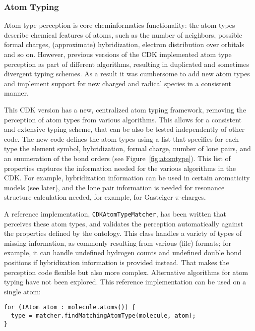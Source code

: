 \documentclass[doublespacing]{bmcart}
\begin{document}
  \subsubsection*{Atom Typing}

  Atom type perception is core cheminformatics functionality: the
  atom types describe chemical features of atoms, such as the number
  of neighbors, possible formal charges, (approximate) hybridization,
  electron distribution over orbitals and so on. However, previous
  versions of the CDK implemented atom type perception as part of
  different algorithms, resulting in duplicated and sometimes
  divergent typing schemes. As a result it was cumbersome to add new
  atom types and implement support for new charged and radical species
  in a consistent manner.
  
  This CDK version has a new, centralized atom typing framework,
  removing the perception of atom types from various algorithms. This
  allows for a consistent and extensive typing scheme, that can be
  also be tested independently of other code.  The new code defines
  the atom types using a list that specifies for each type the element
  symbol, hybridization, formal charge, number of lone pairs, and an
  enumeration of the bond orders (see Figure~\ref{fig:atomtype}). This list of
  properties captures the information needed for the various
  algorithms in the CDK. For example, hybridization information can be
  used in certain aromaticity models (see later), and the lone pair
  information is needed for resonance structure calculation needed,
  for example, for Gasteiger $\pi$-charges.

  A reference implementation, \texttt{CDKAtomTypeMatcher}, has been
  written that perceives these atom types, and validates the
  perception automatically against the properties defined by the
  ontology.  This class handles a variety of types of missing
  information, as commonly resulting from various (file) formats; for
  example, it can handle undefined hydrogen counts and undefined
  double bond positions if hybridization information is provided
  instead.  That makes the perception code flexible but also more
  complex. Alternative algorithms for atom typing have not been
  explored. This reference implementation can be used on a single
  atom:

\vspace{0.2cm}
\begin{verbatim}
for (IAtom atom : molecule.atoms()) {
  type = matcher.findMatchingAtomType(molecule, atom);
}
\end{verbatim}
\vspace{0.2cm}
\end{document}
